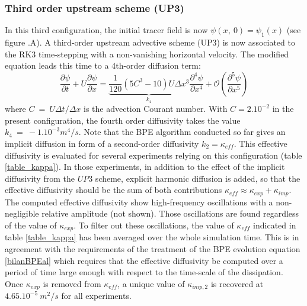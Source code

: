 \subsubsection{Third order upstream scheme (UP3)}
In this third configuration, the initial tracer field is now $\psi(x,\ 0)=\psi_1(x)$ (see figure .A).%
A third-order upstream advective scheme (UP3) is now associated to the RK3 time-stepping with a non-vanishing horizontal velocity. The modified equation leads this time to a 4th-order diffusion term:
\begin{equation}
\frac{\partial \psi}{\partial t}+U \frac{\partial \psi}{\partial x} = \underbrace{\frac{1}{120}(5 C^3-10) U \Delta x^3}_{k_4}  \frac{\partial^4 \psi}{\partial x^4} + \mathcal{O}(\frac{\partial^5 \psi}{\partial x^5})
\end{equation}
where $C\ =\ U\Delta t/\Delta x$ is the advection Courant number. With $C=2 . 10^{-2}$ in the present configuration, the fourth order diffusivity takes the value $k_4\ =\ -1.10^{-3} m^4/s$. Note that the BPE algorithm conducted so far gives an implicit diffusion in form of a second-order diffusivity $k_2=\kappa_{eff}$.
This effective diffusivity is evaluated for several experiments relying on this configuration (table \ref{table_kappa}). In those experiments, in addition to the effect of the implicit diffusivity from the $UP3$ scheme, explicit harmonic diffusion is added, so that the effective diffusivity should be the sum of both contributions $\kappa_{eff} \approx \kappa_{exp} + \kappa_{imp}$.
The computed effective diffusivity show high-frequency oscillations with a non-negligible relative amplitude (not shown). Those oscillations are found regardless of the value of $\kappa_{exp}$. To filter out these oscillations, the value of $\kappa_{eff}$ indicated in table \ref{table_kappa} has been averaged over the whole simulation time. This is in agreement with the requirements of the treatment of the BPE evolution equation \ref{bilanBPEal} which requires that the effective diffusivity be computed over a period of time large enough with respect to the time-scale of the dissipation.
Once $\kappa_{exp}$ is removed from $\kappa_{eff}$, a unique value of $\kappa_{imp,2}$ is recovered at $4.65.10^{-5}\ m^2/s$ for all experiments.

